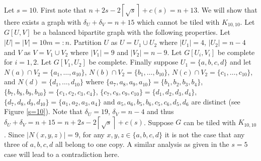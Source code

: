\documentclass[oneside,12pt]{memoir}
\newcommand{\croot}[1]{\left\lceil\sqrt{#1}\right\rceil}
\begin{document}

Let $s=10$.  First note that $n+2s-2\croot{s}+c(s)=n+13$.  We will show that there exists a graph with $\delta_U+\delta_V=n+15$ which cannot be tiled with $K_{10,10}$.  Let $G[U,V]$ be a balanced bipartite graph with the following properties.  Let $|U|=|V|=10m=:n$.  Partition $U$ as $U=U_1\cup U_2$ where $|U_1|=4$, $|U_2|=n-4$ and $V$ as $V=V_1\cup V_2$ where $|V_1|=9$ and $|V_2|=n-9$.  Let $G[U_i, V_i]$ be complete for $i=1,2$.  Let $G[V_1, U_2]$ be complete.  Finally suppose $U_1=\{a,b,c,d\}$ and let $N(a)\cap V_2=\{a_1, \dots, a_{10}\}$, $N(b)\cap V_2=\{b_1,\dots, b_{10}\}$, $N(c)\cap V_2=\{c_1, \dots, c_{10}\}$, and $N(d)=\{d_1,\dots, d_{10}\}$ where $\{a_7,a_8,a_9,a_{10}\}=\{b_1,b_2, b_3, b_4\}$, $\{b_7,b_8,b_9,b_{10}\}=\{c_1,c_2, c_3, c_4\}$, $\{c_7,c_8,c_9,c_{10}\}=\{d_1,d_2, d_3, d_4\}$, $\{d_7,d_8,d_9,d_{10}\}=\{a_1,a_2, a_3, a_4\}$ and $a_5, a_6, b_5, b_6, c_5, c_6, d_5, d_6$ are distinct (see Figure \ref{s=10}).  Note that $\delta_U=19$, $\delta_V=n-4$ and thus $\delta_U+\delta_V=n+15=n+2s-2\croot{s}+c(s)$.  Suppose $G$ can be tiled with $K_{10,10}$.  Since $|N(x,y,z)|=9$, for any $x,y,z\in\{a,b,c,d\}$ it is not the case that any three of $a,b,c,d$ all belong to one copy.  A similar analysis as given in the $s=5$ case will lead to a contradiction here.



\end{document}
